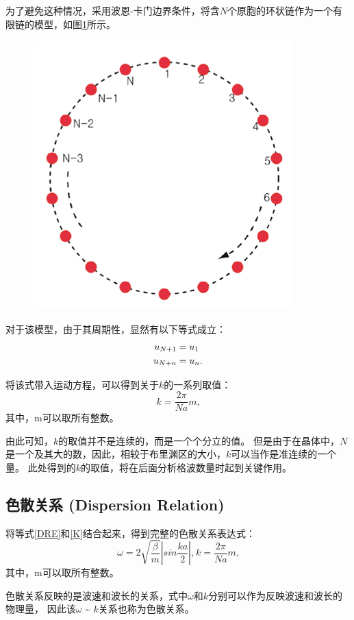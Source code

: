 \documentclass[declarePage]{ecnuthesis}
\begin{document}
为了避免这种情况，采用波恩-卡门边界条件，将含$N$个原胞的环状链作为一个有限链的模型，如图\ref{BKBC}所示。
\begin{figure}[htb]
    \centering
    \includegraphics[width=.5\textwidth]{BKBC.png}
    \label{BKBC}
\end{figure}

对于该模型，由于其周期性，显然有以下等式成立：
\begin{align}
    u_{N+1} &= u_1 \notag\\
    u_{N+n} &= u_n \text{.}
\end{align}

将该式带入运动方程，可以得到关于$k$的一系列取值：
\begin{equation}
    k = \frac{2\pi}{Na}m \text{,} \label{K}
\end{equation}
其中，m可以取所有整数。

由此可知，$k$的取值并不是连续的，而是一个个分立的值。%
但是由于在晶体中，$N$是一个及其大的数，因此，相较于布里渊区的大小，$k$可以当作是准连续的一个量。%
此处得到的$k$的取值，将在后面分析格波数量时起到关键作用。

\subsection{色散关系 (Dispersion Relation)} \label{DR}

将等式\ref{DRE}和\ref{K}结合起来，得到完整的色散关系表达式：
\begin{equation}
    \omega = 2 \sqrt{\frac{\beta}{m}} \left | sin \frac{ka}{2} \right | \text{,} \ k = \frac{2\pi}{Na}m \text{,}\label{DREK}
\end{equation}
其中，m可以取所有整数。

色散关系反映的是波速和波长的关系，式中$\omega$和$k$分别可以作为反映波速和波长的物理量，%
因此该$\omega$ \~{} $k$关系也称为色散关系。
\end{document}
